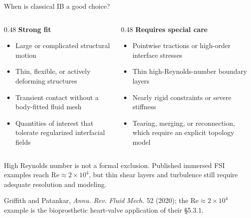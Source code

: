 \documentclass[aspectratio=169,11pt]{beamer}
\begin{document}
\begin{frame}{When is classical IB a good choice?}
\begin{columns}[T,onlytextwidth]
\begin{column}{0.48\textwidth}
\textbf{Strong fit}
\begin{itemize}\itemsep3pt
  \item Large or complicated structural motion
  \item Thin, flexible, or actively deforming structures
  \item Transient contact without a body-fitted fluid mesh
  \item Quantities of interest that tolerate regularized interfacial fields
\end{itemize}
\end{column}
\begin{column}{0.48\textwidth}
\textbf{Requires special care}
\begin{itemize}\itemsep3pt
  \item Pointwise tractions or high-order interface stresses
  \item Thin high-Reynolds-number boundary layers
  \item Nearly rigid constraints or severe stiffness
  \item Tearing, merging, or reconnection, which require an explicit topology model
\end{itemize}
\end{column}
\end{columns}
\begin{punchbox}
\small High Reynolds number is not a formal exclusion. Published immersed FSI examples reach $\mathrm{Re}\approx 2\times10^4$, but thin shear layers and turbulence still require adequate resolution and modeling.
\end{punchbox}
{\tiny Griffith and Patankar, \emph{Annu. Rev. Fluid Mech.} 52 (2020); the $\mathrm{Re}\approx2\times10^4$ example is the bioprosthetic heart-valve application of their \S5.3.1.}
\end{frame}
\end{document}
